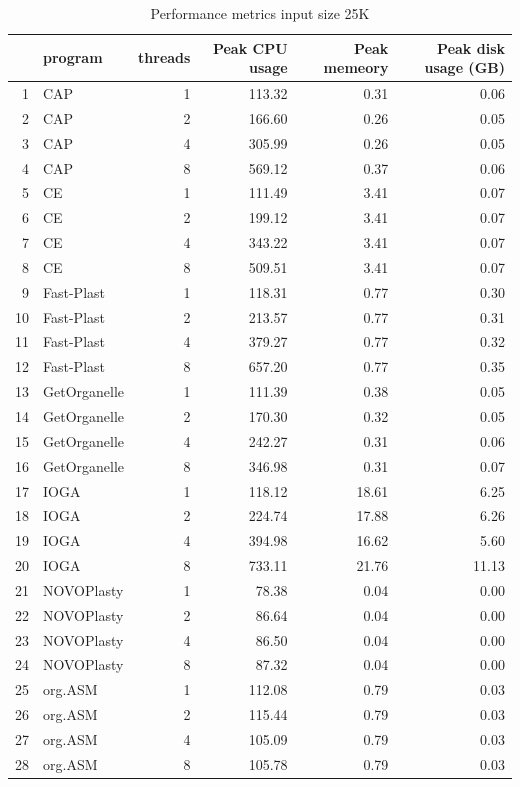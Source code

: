 \documentclass{bmcart}
\begin{document}
\begin{backmatter}
\begin{table}[ht]
\caption{Performance metrics input size 25K}
\label{tab:perform25K}
\centering
\begin{tabular}{rlrrrr}
  \hline
 & program & threads & Peak CPU usage & Peak memeory & Peak disk usage (GB) \\ 
  \hline
1 & CAP &   1 & 113.32 & 0.31 & 0.06 \\ 
  2 & CAP &   2 & 166.60 & 0.26 & 0.05 \\ 
  3 & CAP &   4 & 305.99 & 0.26 & 0.05 \\ 
  4 & CAP &   8 & 569.12 & 0.37 & 0.06 \\ 
  5 & CE &   1 & 111.49 & 3.41 & 0.07 \\ 
  6 & CE &   2 & 199.12 & 3.41 & 0.07 \\ 
  7 & CE &   4 & 343.22 & 3.41 & 0.07 \\ 
  8 & CE &   8 & 509.51 & 3.41 & 0.07 \\ 
  9 & Fast-Plast &   1 & 118.31 & 0.77 & 0.30 \\ 
  10 & Fast-Plast &   2 & 213.57 & 0.77 & 0.31 \\ 
  11 & Fast-Plast &   4 & 379.27 & 0.77 & 0.32 \\ 
  12 & Fast-Plast &   8 & 657.20 & 0.77 & 0.35 \\ 
  13 & GetOrganelle &   1 & 111.39 & 0.38 & 0.05 \\ 
  14 & GetOrganelle &   2 & 170.30 & 0.32 & 0.05 \\ 
  15 & GetOrganelle &   4 & 242.27 & 0.31 & 0.06 \\ 
  16 & GetOrganelle &   8 & 346.98 & 0.31 & 0.07 \\ 
  17 & IOGA &   1 & 118.12 & 18.61 & 6.25 \\ 
  18 & IOGA &   2 & 224.74 & 17.88 & 6.26 \\ 
  19 & IOGA &   4 & 394.98 & 16.62 & 5.60 \\ 
  20 & IOGA &   8 & 733.11 & 21.76 & 11.13 \\ 
  21 & NOVOPlasty &   1 & 78.38 & 0.04 & 0.00 \\ 
  22 & NOVOPlasty &   2 & 86.64 & 0.04 & 0.00 \\ 
  23 & NOVOPlasty &   4 & 86.50 & 0.04 & 0.00 \\ 
  24 & NOVOPlasty &   8 & 87.32 & 0.04 & 0.00 \\ 
  25 & org.ASM &   1 & 112.08 & 0.79 & 0.03 \\ 
  26 & org.ASM &   2 & 115.44 & 0.79 & 0.03 \\ 
  27 & org.ASM &   4 & 105.09 & 0.79 & 0.03 \\ 
  28 & org.ASM &   8 & 105.78 & 0.79 & 0.03 \\ 
   \hline
\end{tabular}
\end{table}


\end{backmatter}
\end{document}
